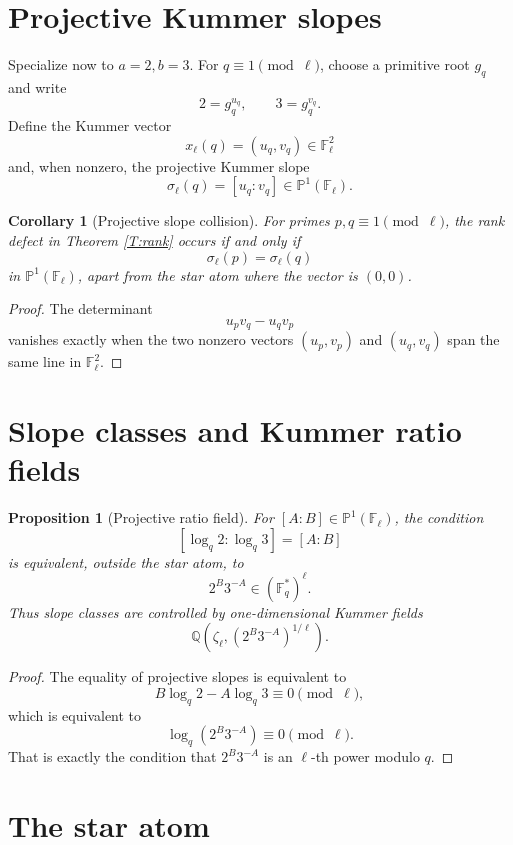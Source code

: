 \documentclass[11pt]{article}
\newtheorem{proposition}{Proposition}
\newtheorem{corollary}{Corollary}
\newcommand{\Q}{\mathbb Q}
\newcommand{\F}{\mathbb F}
\newcommand{\1}{\mathbf 1}
\begin{document}
\section{Projective Kummer slopes}

Specialize now to \(a=2,b=3\).  For \(q\equiv1\pmod\ell\), choose a primitive root \(g_q\) and write
\[
2=g_q^{u_q},\qquad 3=g_q^{v_q}.
\]
Define the Kummer vector
\[
x_\ell(q)=(u_q,v_q)\in\F_\ell^2
\]
and, when nonzero, the projective Kummer slope
\[
\sigma_\ell(q)=[u_q:v_q]\in\mathbb P^1(\F_\ell).
\]

\begin{corollary}[Projective slope collision]\label{C:slope}
For primes \(p,q\equiv1\pmod\ell\), the rank defect in Theorem \ref{T:rank} occurs if and only if
\[
\sigma_\ell(p)=\sigma_\ell(q)
\]
in \(\mathbb P^1(\F_\ell)\), apart from the star atom where the vector is \((0,0)\).
\end{corollary}

\begin{proof}
The determinant
\[
u_pv_q-u_qv_p
\]
vanishes exactly when the two nonzero vectors \((u_p,v_p)\) and \((u_q,v_q)\) span the same line in \(\F_\ell^2\).
\end{proof}

\section{Slope classes and Kummer ratio fields}

\begin{proposition}[Projective ratio field]\label{P:ratio}
For \([A:B]\in\mathbb P^1(\F_\ell)\), the condition
\[
[\log_q2:\log_q3]=[A:B]
\]
is equivalent, outside the star atom, to
\[
2^B3^{-A}\in(\F_q^*)^\ell.
\]
Thus slope classes are controlled by one-dimensional Kummer fields
\[
\Q(\zeta_\ell,(2^B3^{-A})^{1/\ell}).
\]
\end{proposition}

\begin{proof}
The equality of projective slopes is equivalent to
\[
B\log_q2-A\log_q3\equiv0\pmod\ell,
\]
which is equivalent to
\[
\log_q(2^B3^{-A})\equiv0\pmod\ell.
\]
That is exactly the condition that \(2^B3^{-A}\) is an \(\ell\)-th power modulo \(q\).
\end{proof}

\section{The star atom}
\end{document}
